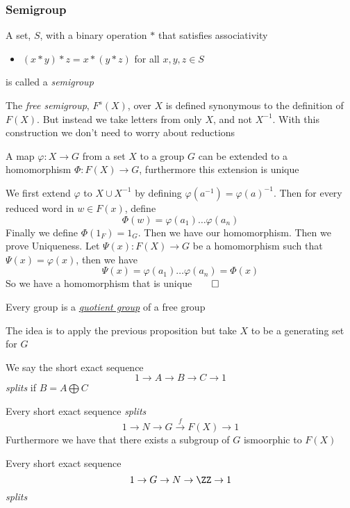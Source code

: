 \subsubsection{Semigroup}
\begin{definition}[Semigroup]
    A set, $S$, with a binary operation $*$ that satisfies associativity
    \begin{itemize}
        \item $(x*y) * z = x * (y*z)$ for all $x,y,z\in S$
    \end{itemize}
    is called a \textit{semigroup}
\end{definition}
\BBreak
The \textit{free semigroup}, $F^s(X)$, over $X$ is defined synonymous to the definition of $F(X)$. But instead we take letters from only $X$, and not $X^{-1}$. With this construction we don't need to worry about reductions
\begin{proposition}
    \hypertarget{Prop1_27}{}A map $\varphi:X\to G$ from a set $X$ to a group $G$ can be extended to a homomorphism $\Phi :F(X)\to G$, furthermore this extension is unique
\end{proposition}
We first extend $\varphi$ to $X\cup X^{-1}$ by defining $\varphi(a^{-1})=\varphi(a)^{-1}$. Then for every reduced word in $w\in F(x)$, define 
\[ \Phi(w) = \varphi(a_1)\ldots\varphi(a_n)\]
Finally we define $\Phi(1_F) = 1_G$. Then we have our homomorphism. Then we prove Uniqueness. Let $\Psi(x):F(X)\to G$ be a homomorphism such that $\Psi(x) =\varphi(x)$, then we have
\[\Psi(x) = \varphi(a_1)\ldots\varphi(a_n) = \Phi(x)\]
\noindent So we have a homomorphism that is unique$\qed$
\begin{corollary}
    Every group is a \href{https://en.wikipedia.org/wiki/Quotient_group#Definition}{\textit{quotient group}} of a free group
\end{corollary}
The idea is to apply the previous proposition but take $X$ to be a generating set for $G$
\begin{definition}[Split]
    We say the short exact sequence
    \[1\to A\to B\to C\to 1\]
    \textit{splits} if $B= A\bigoplus C$
\end{definition}
\begin{lemma}
    Every short exact sequence \textit{splits}
    \[1\to N\to G\stackrel{f}{\to} F(X)\to 1\]
    Furthermore we have that there exists a subgroup of $G$ ismoorphic to $F(X)$
\end{lemma}
\begin{corollary}
    Every short exact sequence 
    \[1\to G\to N\to\ZZ\to1\]
    \textit{splits}
\end{corollary}
